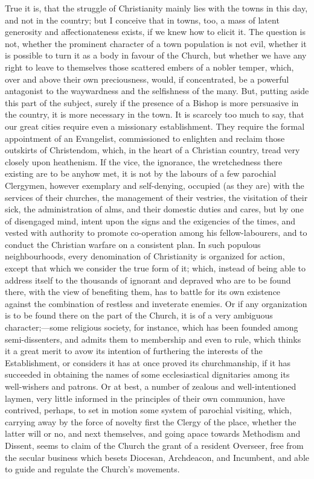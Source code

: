 True it is, that the struggle of Christianity
mainly lies with the towns in this day, and not in the country; but I
conceive that in towns, too, a mass of latent generosity and
affectionateness exists, if we knew how to elicit it. The question is
not, whether the prominent character of a town population is not evil,
whether it is possible to turn it as a body in favour of the Church,
but whether we have any right to leave to themselves those scattered
embers of a nobler temper, which, over and above their own
preciousness, would, if concentrated, be a powerful antagonist to the
waywardness and the selfishness of the many. But, putting aside this
part of the subject, surely if the presence of a Bishop is more
persuasive in the country, it is more necessary in the town. It is
scarcely too much to say, that our great cities require even a
missionary establishment. They require the formal appointment of an
Evangelist, commissioned to enlighten and reclaim those outskirts of
Christendom, which, in the heart of a Christian country, tread very
closely upon heathenism. If the vice, the ignorance, the
wretchedness there existing are to be anyhow met, it is not by the
labours of a few parochial Clergymen, however exemplary and
self-denying, occupied (as they are) with the services of their
churches, the management of their vestries, the visitation of their
sick, the administration of alms, and their domestic duties and cares,
but by one of disengaged mind, intent upon the signs and the
exigencies of the times, and vested with authority to promote
co-operation among his fellow-labourers, and to conduct the Christian
warfare on a consistent plan. In such populous neighbourhoods, every
denomination of Christianity is organized for action, except that
which we consider the true form of it; which, instead of being able to
address itself to the thousands of ignorant and depraved who are to be
found there, with the view of benefiting them, has to battle for its
own existence against the combination of restless and inveterate
enemies. Or if any organization is to be found there on the part of
the Church, it is of a very ambiguous character;—some religious
society, for instance, which has been founded among semi-dissenters,
and admits them to membership and even to rule, which thinks it a
great merit to avow its intention of furthering the interests of the
Establishment, or considers it has at once proved its churchmanship,
if it has succeeded in obtaining the names of some ecclesiastical
dignitaries among its well-wishers and patrons. Or at best, a number
of zealous and well-intentioned laymen, very little informed in the
principles of their own communion, have contrived, perhaps, to set in
motion some system of parochial visiting, which, carrying away by the
force of novelty first the Clergy of the place, whether the latter
will or no, and next themselves, and going apace towards Methodism and
Dissent, seems to claim of the Church the grant of a resident
Overseer, free from the secular business which besets Diocesan,
Archdeacon, and Incumbent, and able to guide and regulate the
Church's movements.

